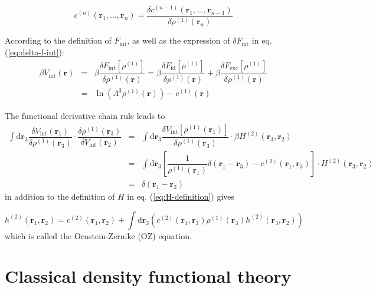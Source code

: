 \begin{equation}
c^{(n)}(\mathbf{r}_{1},\ldots,\mathbf{r}_{n})=\dfrac{\delta c^{(n-1)}(\mathbf{r}_{1},\ldots,\mathbf{r}_{n-1})}{\delta\rho^{(1)}(\mathbf{r}_{n})}\label{eq:1.def-dcf}
\end{equation}

According to the definition of $F_{\mathrm{int}}$, as well as the
expression of $\delta F_{\mathrm{int}}$ in eq. (\ref{eq:delta-f-int}):
\begin{eqnarray}
\beta V_{\mathrm{int}}(\mathbf{r}) & = & \beta\dfrac{\delta F_{\mathrm{int}}[\rho^{(1)}]}{\delta\rho^{(1)}(\mathbf{r})}=\beta\dfrac{\delta F_{\mathrm{id}}[\rho^{(1)}]}{\delta\rho^{(1)}(\mathbf{r})}+\beta\dfrac{\delta F_{\mathrm{exc}}[\rho^{(1)}]}{\delta\rho^{(1)}(\mathbf{r})}\nonumber \\
 & = & \ln\left(\Lambda^{3}\rho^{(1)}(\mathbf{r})\right)-c^{(1)}(\mathbf{r})\label{eq:c1}
\end{eqnarray}

The functional derivative chain rule leads to
\begin{eqnarray}
\int\mathrm{d}\mathbf{r}_{3}\dfrac{\delta V_{\mathrm{int}}(\mathbf{r}_{1})}{\delta\rho^{(1)}(\mathbf{r}_{3})}\cdot\dfrac{\delta\rho^{(1)}(\mathbf{r}_{3})}{\delta V_{\mathrm{int}}(\mathbf{r}_{2})} & = & \int\mathrm{d}\mathbf{r}_{3}\dfrac{\delta V_{\mathrm{int}}[\rho^{(1)}(\mathbf{r}_{1})]}{\delta\rho^{(1)}(\mathbf{r}_{3})}\cdot\beta H^{(2)}(\mathbf{r}_{3},\mathbf{r}_{2})\nonumber \\
 & = & \int\mathrm{d}\mathbf{r}_{3}\left[\dfrac{1}{\rho^{(1)}(\mathbf{r}_{1})}\delta(\mathbf{r}_{1}-\mathbf{r}_{3})-c^{(2)}(\mathbf{r}_{1},\mathbf{r}_{3})\right]\cdot H^{(2)}(\mathbf{r}_{3},\mathbf{r}_{2})\nonumber \\
 & = & \delta(\mathbf{r}_{1}-\mathbf{r}_{2})
\end{eqnarray}
in addition to the definition of $H$ in eq. (\ref{eq:H-definition})
gives

\begin{equation}
h^{(2)}(\mathbf{r}_{1},\mathbf{r}_{2})=c^{(2)}(\mathbf{r}_{1},\mathbf{r}_{2})+\int\mathrm{d}\mathbf{r}_{3}\left(c^{(2)}(\mathbf{r}_{1},\mathbf{r}_{3})\rho^{(1)}(\mathbf{r}_{3})h^{(2)}(\mathbf{r}_{3},\mathbf{r}_{2})\right)\label{eq:1.oz-origine}
\end{equation}
which is called the Ornstein-Zernike (\acs{OZ}) equation. 

\section{Classical density functional theory\label{sec:Classical-density-functional}}

